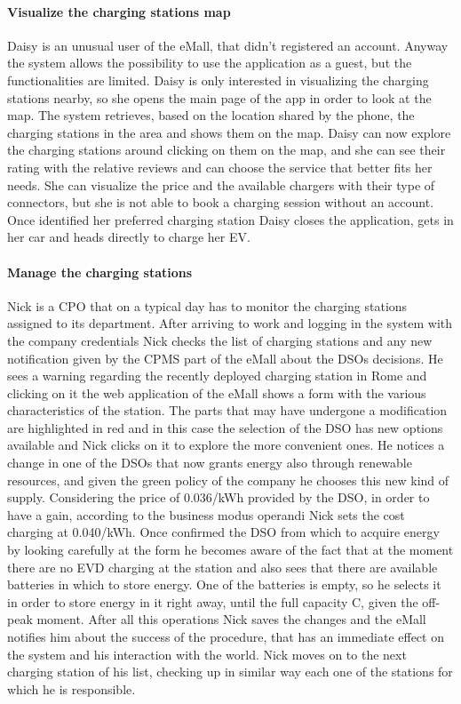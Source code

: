 \paragraph{Visualize the charging stations map}
Daisy is an unusual user of the eMall, that didn't registered an account. Anyway the system allows the possibility to use the application as a guest, but the functionalities are limited. Daisy is only interested in visualizing the charging stations nearby, so she opens the main page of the app in order to look at the map. The system retrieves, based on the location shared by the phone, the charging stations in the area and shows them on the map. Daisy can now explore the charging stations around clicking on them on the map, and she can see their rating with the relative reviews and can choose the service that better fits her needs. She can visualize the price and the available chargers with their type of connectors, but she is not able to book a charging session without an account. Once identified her preferred charging station Daisy closes the application, gets in her car and heads directly to charge her EV.

\paragraph{Manage the charging stations}
Nick is a CPO that on a typical day has to monitor the charging stations assigned to its department. After arriving to work and logging in the system with the company credentials Nick checks the list of charging stations and any new notification given by the CPMS part of the eMall about the DSOs decisions. He sees a warning regarding the recently deployed charging station in Rome and clicking on it the web application of the eMall shows a form with the various characteristics of the station. The parts that may have undergone a modification are highlighted in red and in this case the selection of the DSO has new options available and Nick clicks on it to explore the more convenient ones. He notices a change in one of the DSOs that now grants energy also through renewable resources, and given the green policy of the company he chooses this new kind of supply. Considering the price of 0.036/kWh provided by the DSO, in order to have a gain, according to the business modus operandi Nick sets the cost charging at 0.040/kWh. Once confirmed the DSO from which to acquire energy by looking carefully at the form he becomes aware of the fact that at the moment there are no EVD charging at the station and also sees that there are available batteries in which to store energy. One of the batteries is empty, so he selects it in order to store energy in it right away, until the full capacity C, given the off-peak moment. After all this operations Nick saves the changes and the eMall notifies him about the success of the procedure, that has an immediate effect on the system and his interaction with the world. Nick moves on to the next charging station of his list, checking up in similar way each one of the stations for which he is responsible. 

